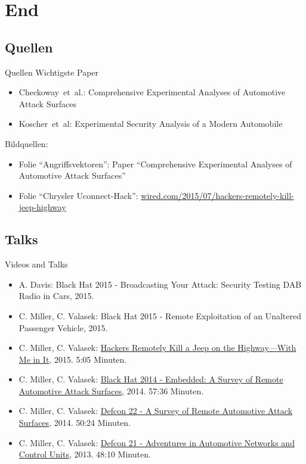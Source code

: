 \section*{End}

\subsection{Quellen}
\begin{frame}{Quellen}
    Wichtigste Paper
    \begin{itemize}
        \item Checkoway~et~al.: Comprehensive Experimental Analyses of Automotive Attack Surfaces
        \item Koscher~et~al: Experimental Security Analysis of a Modern Automobile
    \end{itemize}

    Bildquellen:
    \begin{itemize}
        \item Folie \enquote{Angriffsvektoren}: Paper \enquote{Comprehensive Experimental Analyses of Automotive Attack Surfaces}
        \item Folie \enquote{Chrysler Uconnect-Hack}: \href{http://www.wired.com/2015/07/hackers-remotely-kill-jeep-highway/}{wired.com/2015/07/hackers-remotely-kill-jeep-highway}
    \end{itemize}
\end{frame}

\subsection{Talks}
\begin{frame}{Videos and Talks}
    \begin{itemize}
        \item A. Davis: Black Hat 2015 - Broadcasting Your Attack: Security Testing DAB Radio in Cars, 2015.
        \item C. Miller, C. Valasek: Black Hat 2015 - Remote Exploitation of an Unaltered Passenger Vehicle, 2015.
        \item C. Miller, C. Valasek: \href{http://www.wired.com/2015/07/hackers-remotely-kill-jeep-highway/}{Hackers Remotely Kill a Jeep on the Highway—With Me in It}, 2015. 5:05 Minuten.
        \item C. Miller, C. Valasek: \href{https://www.youtube.com/watch?v=mNhFGJVq2HE}{Black Hat 2014 - Embedded: A Survey of Remote Automotive Attack Surfaces}, 2014. 57:36 Minuten.
        \item C. Miller, C. Valasek: \href{https://www.youtube.com/watch?v=tnYO4U0h_wY}{Defcon 22 - A Survey of Remote Automotive Attack Surfaces}, 2014. 50:24 Minuten.
        \item C. Miller, C. Valasek: \href{https://www.youtube.com/watch?v=MEYCU62yeYk}{Defcon 21 - Adventures in Automotive Networks and Control Units}, 2013. 48:10 Minuten.
    \end{itemize}
\end{frame}